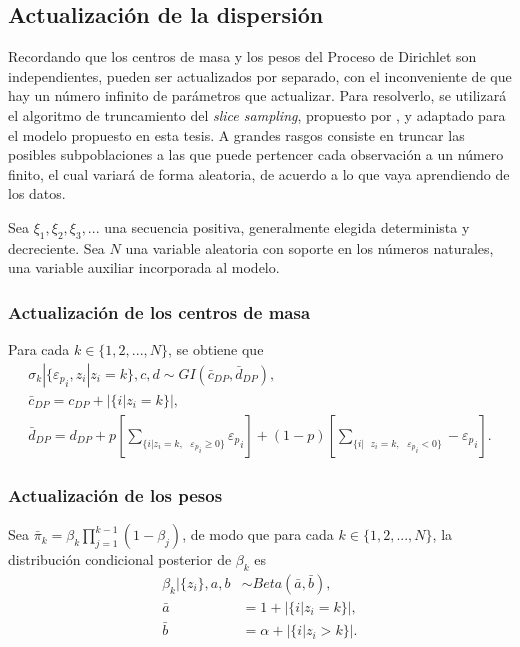 \subsection{Actualizaci\'on de la dispersi\'on}

Recordando que los centros de masa y los pesos del Proceso de Dirichlet son independientes, pueden ser actualizados por separado, con el inconveniente de que hay un n\'umero infinito de par\'ametros que actualizar. Para resolverlo, se utilizará el algoritmo de truncamiento del \textit{slice sampling}, propuesto por \cite{Kalli_Slice}, y adaptado para el modelo propuesto en esta tesis. A grandes rasgos consiste en truncar las posibles subpoblaciones a las que puede pertencer cada observación a un número finito, el cual variará de forma aleatoria, de acuerdo a lo que vaya aprendiendo de los datos. 

Sea $\xi_1,\xi_2,\xi_3,...$ una secuencia positiva, generalmente elegida determinista y decreciente. Sea $N$ una variable aleatoria con soporte en los n\'umeros naturales, una variable auxiliar incorporada al modelo.

\subsubsection{Actualizaci\'on de los centros de masa}

Para cada $k \in \{1,2,...,N\}$, se obtiene que 
\begin{equation*}
\begin{gathered}
    \sigma_k | \{{\varepsilon_p}_i, z_i | z_i = k\}, c, d \sim GI(\bar{c}_{DP}, \bar{d}_{DP}),\\
    \bar{c}_{DP} = c_{DP} + |\{i| z_i = k\}|, \\
    \bar{d}_{DP} = d_{DP} 
    + p \left[\sum_{\{i| z_i = k,\text{ }{\varepsilon_p}_i \geq 0\}} {\varepsilon_p}_i\right]
    + (1-p) \left[\sum_{\{i| \text{ } z_i = k,\text{ }{\varepsilon_p}_i < 0\}}  -{\varepsilon_p}_i\right].
\end{gathered}
\end{equation*}

\subsubsection{Actualizaci\'on de los pesos}

Sea $\bar{\pi}_k = \beta_k \prod_{j=1}^{k-1}(1 - \beta_j)$, de modo que para cada $k \in \{1,2,...,N\}$, la distribuci\'on condicional posterior de $\beta_k$ es
\begin{equation*}
\begin{aligned}
    \beta_k|\{z_i\}, a,b &\sim Beta(\bar{a}, \bar{b}), \\
    \bar{a} &= 1 + |\{i|z_i = k\}|, \\
    \bar{b} &= \alpha + |\{i|z_i > k\}|.
\end{aligned}
\end{equation*}

